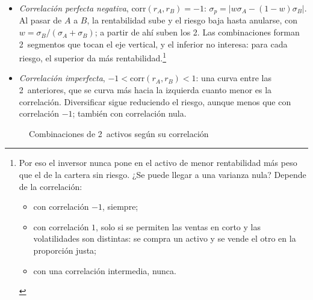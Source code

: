 \documentclass[11pt]{article}
\begin{document}
\begin{itemize}
\begin{itemize}
  \item \emph{Correlación perfecta negativa}, $\mathrm{corr}(r_A,r_B)=-1$: $\sigma_p=|w\sigma_A-(1-w)\sigma_B|$. Al pasar de $A$ a $B$, la rentabilidad sube y el riesgo baja hasta anularse, con $w=\sigma_B/(\sigma_A+\sigma_B)$; a partir de ahí suben los 2. Las combinaciones forman 2~segmentos que tocan el eje vertical, y el inferior no interesa: para cada riesgo, el superior da más rentabilidad.\footnote{Por eso el inversor nunca pone en el activo de menor rentabilidad más peso que el de la cartera sin riesgo. ¿Se puede llegar a una varianza nula? Depende de la correlación:
\begin{itemize}
\item con correlación $-1$, siempre;
\item con correlación $1$, solo si se permiten las ventas en corto y las volatilidades son distintas: se compra un activo y se vende el otro en la proporción justa;
\item con una correlación intermedia, nunca.
\end{itemize}}
  \item \emph{Correlación imperfecta}, $-1<\mathrm{corr}(r_A,r_B)<1$: una curva entre las 2~anteriores, que se curva más hacia la izquierda cuanto menor es la correlación. Diversificar sigue reduciendo el riesgo, aunque menos que con correlación $-1$; también con correlación nula.
  \end{itemize}
\end{itemize}
\begin{figure}[H]
\centering
\caption{Combinaciones de 2~activos según su correlación}\label{fig:correlaciones}
\end{figure}
\end{document}
